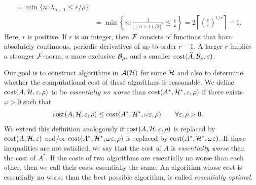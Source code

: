\documentclass[graybox,footinfo]{svmult}
\begin{document}
\begin{example}
\begin{align*}
	=\min\{ n : \lambda_{n+1} \le \varepsilon/\rho \} \\
	& = \min \left\{ n : \frac{1}{\lfloor (n+1)/2 \rfloor^r} \le \frac{\varepsilon}{\rho} \right\} 
	= 2 \left \lceil \left(\frac{\rho}{\varepsilon} \right)^{1/r} \right \rceil - 1.
	\end{align*}
	Here, $r$ is positive.  If $r$ is an integer, then ${\mathcal{F}}$ consists of functions that have absolutely continuous, periodic derivatives of up to order $r-1$.  A larger $r$ implies a stronger ${\mathcal{F}}$-norm, a more exclusive ${\mathcal{B}}_\rho$, and a smaller  $\textup{cost}(\widehat{A},{\mathcal{B}}_{\rho},\varepsilon)$.
\end{example}


Our goal is to construct algorithms in ${\mathcal{A}}({\mathcal{H}})$ for some ${\mathcal{H}}$ and also to determine whether the computational cost of these algorithms is reasonable.  We define  $\textup{cost}(A,{\mathcal{H}},\varepsilon,\rho)$ to be \emph{essentially no worse} than $\textup{cost}(A^*,{\mathcal{H}}^*,\varepsilon,\rho)$ if  there exists 
$\omega > 0$ such that
\begin{equation} \label{essNoWorseDef}
    \textup{cost}(A,\calH,\varepsilon,\rho)
    \le 
    \textup{cost}(A^*,\calH^*,\omega\varepsilon,\rho)
    \qquad \forall \varepsilon,\rho > 0.
\end{equation}
We extend this definition analogously if $\textup{cost}(A,{\mathcal{H}},\varepsilon,\rho)$ is replaced by $\textup{cost}(A,{\mathcal{H}},\varepsilon)$ and/or $\textup{cost}(A^*,{\mathcal{H}}^*,\omega\varepsilon,\rho)$ is replaced by $\textup{cost}(A^*,{\mathcal{H}}^*,\omega\varepsilon)$.
If these inequalities are not satisfied, we say that the cost of  $A$ is \emph{essentially worse}  than the cost of $A^*$.
If the costs of two algorithms are essentially no worse than each other, then we call their costs essentially the same.  An algorithm whose cost is essentially no worse than the best possible algorithm, is called \emph{essentially optimal}.
\end{document}
